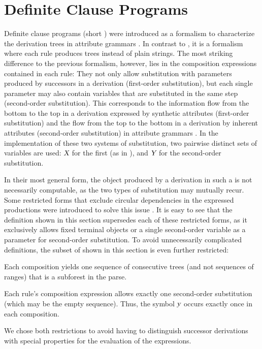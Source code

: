 \documentclass[../../document.tex]{subfiles}
\begin{document}
    \section{Definite Clause Programs}\label{sec:grammar:dcp}
    Definite clause programs (short ) were introduced as a formalism to characterize the derivation trees in attribute grammars \citep{Der85}.
    In contrast to , it is a formalism where each rule produces trees instead of plain strings.
    The most striking difference to the previous formalism, however, lies in the composition expressions contained in each rule:
    They not only allow substitution with parameters produced by successors in a derivation (first-order substitution), but each single parameter may also contain variables that are substituted in the same step (second-order substitution).
    This corresponds to the information flow from the bottom to the top in a derivation expressed by synthetic attributes (first-order substitution) and the flow from the top to the bottom in a derivation by inherent attributes (second-order substitution) in attribute grammars \citep[cf.\@][Section~1]{Der88}.
    In the implementation of these two systems of substitution, two pairwise distinct sets of variables are used: \(\textsl{X}\) for the first (as in ), and \(\textsl{Y}\) for the second-order substitution.

    In their most general form, the object produced by a derivation in such a  is not necessarily computable, as the two types of substitution may mutually recur.
    Some restricted forms that exclude circular dependencies in the expressed productions were introduced to solve this issue \citep[Section~3.4 discusses non-circular attribute grammars]{Cou82}.
    It is easy to see that the definition shown in this section supersedes each of these restricted forms, as it exclusively allows fixed terminal objects or a single second-order variable as a parameter for second-order substitution.
    To avoid unnecessarily complicated definitions, the subset of  shown in this section is even further restricted:
    \begin{inparaenum}
        \item Each composition yields one sequence of consecutive trees (and not sequences of ranges) that is a subforest in the parse.
        \item Each rule's composition expression allows exactly one second-order substitution (which may be the empty sequence). Thus, the symbol \(\textsl{y}\) occurs exactly once in each composition.
    \end{inparaenum}
    We chose both restrictions to avoid having to distinguish successor derivations with special properties for the evaluation of the expressions.
\end{document}
